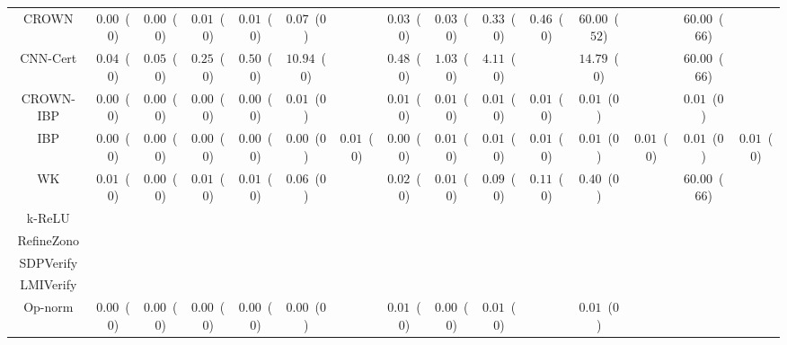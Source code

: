 \begin{table*}
{\begin{tabular}{c|c|c|c|c|c|c|c|c|c|c|c|c|c|c}
        CROWN &  $0.00$~($0$) &  $0.00$~($0$) &  $0.01$~($0$) &  $0.01$~($0$) &  $0.07$~($0$) &               &  $0.03$~($0$) &  $0.03$~($0$) &  $0.33$~($0$) &  $0.46$~($0$) & $60.00$~($52$) &               & $60.00$~($66$) &               \\
     CNN-Cert &  $0.04$~($0$) &  $0.05$~($0$) &  $0.25$~($0$) &  $0.50$~($0$) & $10.94$~($0$) &               &  $0.48$~($0$) &  $1.03$~($0$) &  $4.11$~($0$) &               & $14.79$~($0$) &               & $60.00$~($66$) &               \\
    CROWN-IBP &  $0.00$~($0$) &  $0.00$~($0$) &  $0.00$~($0$) &  $0.00$~($0$) &  $0.01$~($0$) &               &  $0.01$~($0$) &  $0.01$~($0$) &  $0.01$~($0$) &  $0.01$~($0$) &  $0.01$~($0$) &               &  $0.01$~($0$) &               \\
          IBP &  $0.00$~($0$) &  $0.00$~($0$) &  $0.00$~($0$) &  $0.00$~($0$) &  $0.00$~($0$) &  $0.01$~($0$) &  $0.00$~($0$) &  $0.01$~($0$) &  $0.01$~($0$) &  $0.01$~($0$) &  $0.01$~($0$) &  $0.01$~($0$) &  $0.01$~($0$) &  $0.01$~($0$) \\
           WK &  $0.01$~($0$) &  $0.00$~($0$) &  $0.01$~($0$) &  $0.01$~($0$) &  $0.06$~($0$) &               &  $0.02$~($0$) &  $0.01$~($0$) &  $0.09$~($0$) &  $0.11$~($0$) &  $0.40$~($0$) &               & $60.00$~($66$) &               \\
       k-ReLU &               &               &               &               &               &               &               &               &               &               &               &               &               &               \\
   RefineZono &               &               &               &               &               &               &               &               &               &               &               &               &               &               \\
    SDPVerify &               &               &               &               &               &               &               &               &               &               &               &               &               &               \\
    LMIVerify &               &               &               &               &               &               &               &               &               &               &               &               &               &               \\
      Op-norm &  $0.00$~($0$) &  $0.00$~($0$) &  $0.00$~($0$) &  $0.00$~($0$) &  $0.00$~($0$) &               &  $0.01$~($0$) &  $0.00$~($0$) &  $0.01$~($0$) &               &  $0.01$~($0$) &               &               &               \\

\end{tabular}}
\end{table*}
